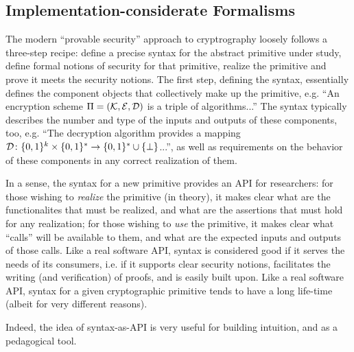 
\subsection{Implementation-considerate Formalisms}
The modern ``provable security'' approach to cryptrography loosely follows a
three-step recipe: define a precise syntax for the abstract primitive under
study, define formal notions of security for that primitive, realize the
primitive and prove it meets the security notions.  The first step, defining the
syntax, essentially defines the component objects that collectively make up the
primitive, e.g. ``An encryption scheme $\Pi=(\mathcal{K},\mathcal{E},\mathcal{D})$ is a triple of
algorithms...''  The syntax typically describes the number and type of the
inputs and outputs of these components, too, e.g. ``The decryption algorithm
provides a mapping $\mathcal{D}\colon\{0,1\}^{k}\times\{0,1\}^* \to \{0,1\}^* \cup
\{\bot\}$...'', as well as requirements on the behavior of these components in
any correct realization of them.

In a sense, the syntax for a new primitive provides an API for researchers: for
those wishing to \emph{realize} the primitive (in theory), it makes clear what
are the functionalites that must be realized, and what are the assertions that
must hold for any realization; for those wishing to \emph{use} the primitive, it
makes clear what ``calls'' will be available to them, and what are the expected
inputs and outputs of those calls.
%
Like a real software API, syntax is considered good if it serves the needs of
its consumers, i.e. if it supports clear security notions, facilitates the
writing (and verification) of proofs, and is easily built upon.
%
Like a real software API, syntax for a given cryptographic primitive tends to
have a long life-time (albeit for very different reasons).
%
Indeed, the idea of syntax-as-API is very useful for building intuition, and as
a pedagogical tool.

